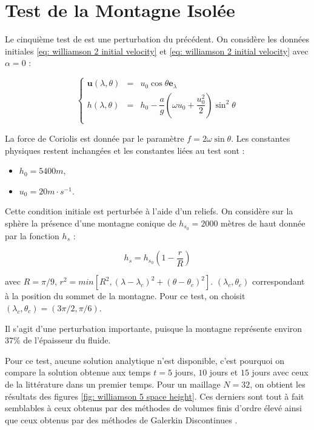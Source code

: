 \newpage
\section{Test de la Montagne Isolée}

Le cinquième test de \cite{Williamson1992} est une perturbation du précédent.
On considère les données initiales \eqref{eq: williamson 2 initial velocity} et \eqref{eq: williamson 2 initial velocity} avec $\alpha = 0$ :

\begin{equation}
\left\lbrace
\begin{array}{rcl}
\mathbf{u}(\lambda, \theta) & = & u_0 \cos \theta \mathbf{e}_{\lambda} \\
h(\lambda, \theta) & = & h_0 - \dfrac{a}{g} \left( \omega u_0 + \dfrac{u_0^2}{2} \right) \sin^2 \theta \\
\end{array}
\right.
\end{equation}

La force de Coriolis est donnée par le paramètre $f = 2 \omega \sin \theta$. Les constantes physiques restent inchangées et les constantes liées au test sont :

\begin{itemize}
\item $h_0 = 5400 m$,
\item $u_0 = 20 m \cdot s^{-1}$.
\end{itemize}

Cette condition initiale est perturbée à l'aide d'un reliefs.
On considère sur la sphère la présence d'une montagne conique de $h_{s_0} = 2000$ mètres de haut donnée par la fonction $h_s$ :

\begin{equation}
h_s = h_{s_0} \left( 1 - \dfrac{r}{R} \right)
\end{equation}

avec $R= \pi / 9$, $r^2 = min \left[ R^2, \left( \lambda - \lambda_c \right)^2 + \left( \theta - \theta_c \right)^2 \right]$. $(\lambda_c, \theta_c)$ correspondant à la position du sommet de la montagne. Pour ce test, on choisit $(\lambda_c, \theta_c) = (3 \pi / 2, \pi / 6)$.

Il s'agit d'une perturbation importante, puisque la montagne représente environ $37 \%$ de l'épaisseur du fluide.

Pour ce test, aucune solution analytique n'est disponible, c'est pourquoi on compare la solution obtenue aux temps $t=5$ jours, $10$ jours et $15$ jours avec ceux de la littérature dans un premier temps. Pour un maillage $N=32$, on obtient les résultats des figures \ref{fig: williamson 5 space height}. Ces derniers sont tout à fait semblables à ceux obtenus par des méthodes de volumes finis \cite{Katta2015, Chen2008} d'ordre élevé ainsi que ceux obtenus par des méthodes de Galerkin Discontinues \cite{Nair2005}. 

